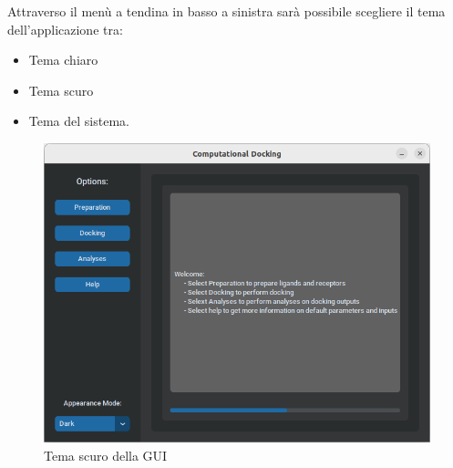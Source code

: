 Attraverso il menù a tendina in basso a sinistra sarà possibile scegliere il tema dell'applicazione tra:

\begin{itemize}
    \item Tema chiaro
    \item Tema scuro
    \item Tema del sistema.
\end{itemize}

\begin{figure}[H]
    \centering
    \includegraphics[scale=0.6]{immagini/capitolo3/darkGUI.png}
    \caption{Tema scuro della GUI}
    \label{fig:dark GUI}
\end{figure}

